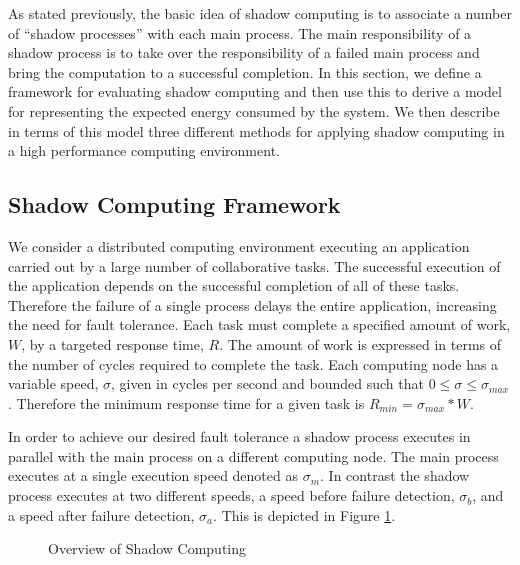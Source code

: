 As stated previously, the basic idea of shadow computing is to
associate a number of ``shadow processes'' with each main process. The
main responsibility of a shadow process is to take over the
responsibility of a failed main process and bring the computation to a
successful completion.  In this section, we define a framework for
evaluating shadow computing and then use this to derive a model for
representing the expected energy consumed by the system. We then
describe in terms of this model three different methods for applying
shadow computing in a high performance computing environment.


\subsection{Shadow Computing Framework}
\label{shadow_computing_framework}

We consider a distributed computing environment executing an
application carried out by a large number of collaborative tasks. The
successful execution of the application depends on the successful
completion of all of these tasks. Therefore the failure of a single
process delays the entire application, increasing the need for fault
tolerance. Each task must complete a specified amount of work, $W$, by
a targeted response time, $R$. The amount of work is expressed in
terms of the number of cycles required to complete the task. Each
computing node has a variable speed, $\sigma$, given in cycles per
second and bounded such that $0\leq\sigma\leq\sigma_{max}$. Therefore
the minimum response time for a given task is $R_{min}=\sigma_{max}*W$.

In order to achieve our desired fault tolerance a shadow process
executes in parallel with the main process on a different computing
node. The main process executes at a single execution speed denoted as
$\sigma_m$. In contrast the shadow process executes at two different
speeds, a speed before failure detection, $\sigma_b$, and a speed
after failure detection, $\sigma_a$. This is depicted in Figure
\ref{shadow_overview}.

\begin{figure}[hHtb]
\centering
{}
\caption { Overview of Shadow Computing }
\label{shadow_overview}
\end{figure}

